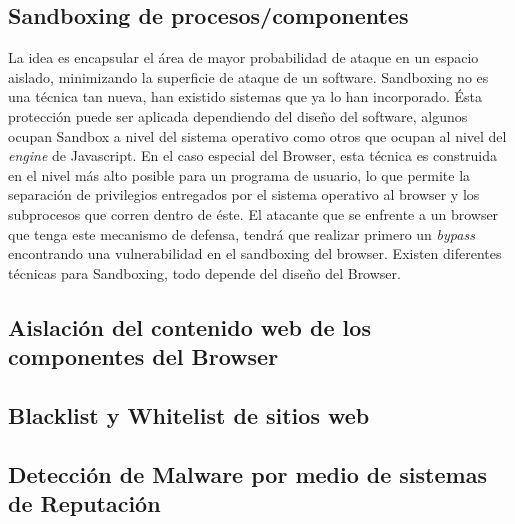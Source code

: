 \subsection{Sandboxing de procesos/componentes}
    \label{chap3:Sandboxing}
    La idea es encapsular el área de mayor probabilidad de ataque en un espacio aislado, minimizando la superficie de ataque de un software. Sandboxing no es una técnica tan nueva, han existido sistemas que ya lo han incorporado. Ésta protección puede ser aplicada dependiendo del diseño del software, algunos ocupan Sandbox a nivel del sistema operativo como otros que ocupan al nivel del \textit{engine} de Javascript. En el caso especial del Browser, esta técnica es construida en el nivel más alto posible para un programa de usuario, lo que permite la separación de privilegios entregados por el sistema operativo al browser y los subprocesos que corren dentro de éste. El atacante que se enfrente a un browser que tenga este mecanismo de defensa, tendrá que realizar primero un \textit{bypass} encontrando una vulnerabilidad en el sandboxing del browser. Existen diferentes técnicas para Sandboxing, todo depende del diseño del Browser.


 \subsection{Aislación del contenido web de los componentes del Browser}

 \subsection{Blacklist y Whitelist de sitios web}

 \subsection{Detección de Malware por medio de sistemas de Reputación}

